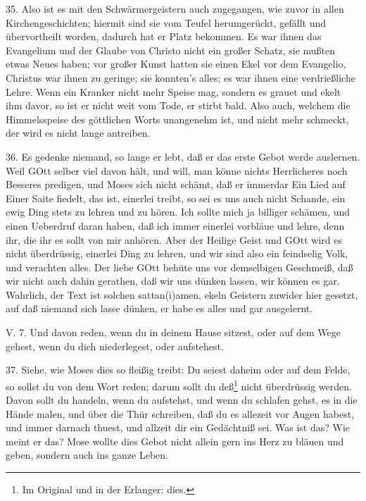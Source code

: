 35. Also ist es mit den Schwärmergeistern auch zugegangen, wie zuvor in allen Kirchengeschichten; hiermit sind sie vom Teufel herumgerückt, gefällt und übervortheilt worden, dadurch hat er Platz bekommen. Es war ihnen das Evangelium und der Glaube von Christo nicht ein großer Schatz, sie mußten etwas Neues haben; vor großer Kunst hatten sie einen Ekel vor dem Evangelio, Christus war ihnen zu geringe; sie konnten’s alles; es war ihnen eine verdrießliche Lehre. Wenn ein Kranker nicht mehr Speise mag, sondern es grauet und ekelt ihm davor, so ist er nicht weit vom Tode, er stirbt bald. Also auch, welchem die Himmelsspeise des göttlichen Worts unangenehm ist, und nicht mehr schmeckt, der wird es nicht lange antreiben.

36. Es gedenke niemand, so lange er lebt, daß er das erste Gebot werde auslernen. Weil GOtt selber viel davon hält, und will, man könne nichts Herrlicheres noch Besseres predigen, und Moses sich nicht schämt, daß er immerdar Ein Lied auf Einer Saite fiedelt, das ist, einerlei treibt, so sei es uns auch nicht Schande, ein ewig Ding stets zu lehren und zu hören. Ich sollte mich ja billiger schämen, und einen Ueberdruf daran haben, daß ich immer einerlei vorbläue und lehre, denn ihr, die ihr es sollt von mir anhören. Aber der Heilige Geist und GOtt wird es nicht überdrüssig, einerlei Ding zu lehren, und wir sind also ein feindselig Volk, und verachten alles. Der liebe GOtt behüte uns vor demselbigen Geschmeiß, daß wir nicht auch dahin gerathen, daß wir uns dünken lassen, wir können es gar. Wahrlich, der Text ist solchen sattan(i)amen, ekeln Geistern zuwider hier gesetzt, auf daß niemand sich lasse dünken, er habe es alles und gar ausgelernt.

\begin{schriftzitat}
V. 7. Und davon reden, wenn du in deinem Hause sitzest, oder auf dem Wege gehest, wenn du dich niederlegest, oder aufstehest.
\end{schriftzitat}

37. Siehe, wie Moses dies so fleißig treibt: Du seiest daheim oder auf dem Felde, so sollst du von dem Wort reden; darum sollt du deß\footnote{Im Original und in der Erlanger: dies.} nicht überdrüssig werden. Davon sollt du handeln, wenn du aufstehst, und wenn du schlafen gehst, es in die Hände malen, und über die Thür schreiben, daß du es allezeit vor Augen habest, und immer darnach thuest, und allzeit dir ein Gedächtniß sei. Was ist das? Wie meint er das? Mose wollte dies Gebot nicht allein gern ins Herz zu bläuen und geben, sondern auch ins ganze Leben.

